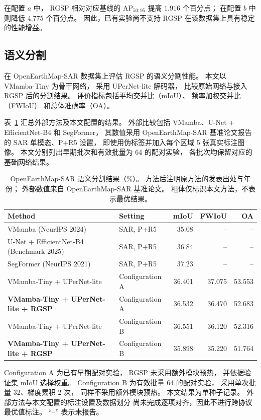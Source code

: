 \documentclass[journal]{IEEEtran}
\begin{document}
在配置 $a$ 中，
RGSP 相对对应基线的 AP$_{50:95}$
提高 $1.916$ 个百分点；
在配置 $b$ 中则降低 $4.775$ 个百分点。
因此，已有实验尚不支持
RGSP 在该数据集上具有稳定的性能增益。
\subsection{语义分割}
\label{sec:segmentation_results}

在 OpenEarthMap-SAR 数据集上评估 RGSP 的语义分割性能。
本文以 VMamba-Tiny 为骨干网络，
采用 UPerNet-lite 解码器，
比较原始网络与接入 RGSP 后的分割结果。
评价指标包括平均交并比（mIoU）、
频率加权交并比（FWIoU）
和总体准确率（OA）。

表~\ref{tab:openearthmap_sar_comparison}
汇总外部方法及本文配置的结果。
外部比较包括 VMamba、U-Net + EfficientNet-B4
和 SegFormer，
其数值采用 OpenEarthMap-SAR 基准论文报告的
SAR 单模态、P+R5 设置，
即使用伪标签并加入每个区域 5 张真实标注图像。
本文分别列出早期批次和有效批量为 64 的配对实验，
各批次均保留对应的基础网络结果。

\begin{table}[!t]
\centering
\small
\setlength{\tabcolsep}{4pt}
\caption{OpenEarthMap-SAR 语义分割结果（\%）。
方法后注明原方法的发表出处与年份；
外部数值来自 OpenEarthMap-SAR 基准论文。
粗体仅标识本文方法，不表示最优结果。}
\label{tab:openearthmap_sar_comparison}
\begin{tabular*}{\textwidth}{@{\extracolsep{\fill}}llrrr}
\toprule
Method & Setting & mIoU & FWIoU & OA \\
\midrule
VMamba (NeurIPS 2024)
& SAR, P+R5
& 35.08 & -- & -- \\

U-Net + EfficientNet-B4 (Benchmark 2025)
& SAR, P+R5
& 36.84 & -- & -- \\

SegFormer (NeurIPS 2021)
& SAR, P+R5
& 37.23 & -- & -- \\

\midrule
VMamba-Tiny + UPerNet-lite
& Configuration A
& 36.401 & 37.075 & 53.553 \\

\textbf{VMamba-Tiny + UPerNet-lite + RGSP}
& Configuration A
& 36.532 & 36.470 & 52.683 \\

VMamba-Tiny + UPerNet-lite
& Configuration B
& 36.551 & 36.120 & 52.316 \\

\textbf{VMamba-Tiny + UPerNet-lite + RGSP}
& Configuration B
& 35.898 & 35.220 & 51.764 \\
\bottomrule
\end{tabular*}

\smallskip
\begin{minipage}{\linewidth}
\footnotesize
Configuration A 为已有早期配对实验，
RGSP 未采用额外模块预热，
并依据验证集 mIoU 选择权重。
Configuration B 为有效批量 64 的配对实验，
采用单次批量 32、梯度累积 2 次，
同样不采用额外模块预热。
本文结果为单种子记录。
外部方法与本文配置的标注设置及数据划分
尚未完成逐项对齐，因此不进行跨协议最优值标注。
``--'' 表示未报告。
\end{minipage}
\end{table}
\end{document}
